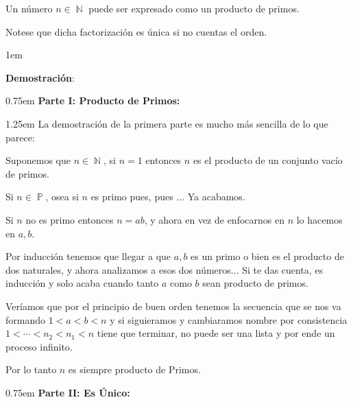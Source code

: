\documentclass[12pt, fleqn]{report}                             %
\newenvironment{Indentation}[1][0.75em]                         %
    {\begin{adjustwidth}{#1}{}}                                     %
    {\end{adjustwidth}}                                             %
\newenvironment{SmallIndentation}[1][0.75em]                    %
    {\begin{adjustwidth}{#1}{}\begin{footnotesize}}                 %
    {\end{footnotesize}\end{adjustwidth}}                           %
\DeclareMathOperator \Naturals  {\mathbb{N}}                     %
\DeclareMathOperator \Primes    {\mathbb{P}}                     %
\begin{document}
        Un número $n \in \Naturals$ puede ser expresado como
        un producto de primos.

        Notese que dicha factorización es única si no cuentas el 
        orden.

        \begin{SmallIndentation}[1em]
            \textbf{Demostración}:\\


            \begin{Indentation}[0.75em]
                \textbf{Parte I: Producto de Primos:}
            \end{Indentation}

            \begin{Indentation}[1.25em]
                La demostración de la primera parte es mucho más sencilla
                de lo que parece:

                Suponemos que $n \in \Naturals$, si $n=1$ entonces $n$ es el
                producto de un conjunto vacío de primos.

                Si $n \in \Primes$, osea si $n$ es primo pues, pues ... Ya acabamos.

                Si $n$ no es primo entonces $n=ab$, y ahora en vez de enfocarnos en 
                $n$ lo hacemos en $a,b$.

                Por inducción tenemos que llegar a que $a,b$ es un primo o bien
                es el producto de dos naturales, y ahora analizamos a esos dos números...
                Si te das cuenta, es inducción y solo acaba cuando tanto $a$ como $b$ sean
                producto de primos.

                Veríamos que por el principio de buen orden tenemos la secuencia que se
                nos va formando $1 < a < b < n$ y si siguieramos y cambiaramos nombre
                por consistencia $1 <\cdots<n_2<n_1<n$ tiene que terminar, no puede ser
                una lista y por ende un proceso infinito.

                Por lo tanto $n$ es siempre producto de Primos.
            \end{Indentation}

            \begin{Indentation}[0.75em]
                \textbf{Parte II: Es Único:}
            \end{Indentation}


\end{SmallIndentation}
\end{document}
